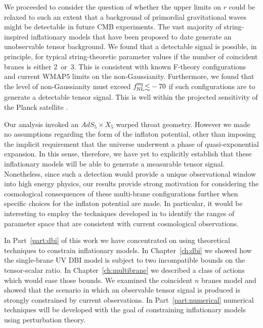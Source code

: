 We proceeded to consider the question of whether the upper limits on 
$r$ could be relaxed to such an extent 
that a background of primordial gravitational waves 
might be detectable in future CMB experiments. The vast majority of 
string-inspired inflationary models that have been proposed to date 
generate an unobservable tensor background. We 
found that a detectable signal is possible, in principle, 
for typical string-theoretic parameter values 
if the number of coincident branes is either $2$~or~$3$. 
This is consistent with known F-theory configurations and 
current WMAP5 limits on the non-Gaussianity. Furthermore, 
we found that the level of non-Gaussianity must exceed $\fnleq 
\lsim -70$ if such configurations are to generate a detectable tensor 
signal. This is well within the projected sensitivity 
of the Planck satellite \cite{planck}.   


Our analysis invoked an $AdS_5 \times X_5$ warped throat geometry. However we 
made no assumptions regarding the form of the inflaton potential, other 
than imposing the implicit requirement that the universe underwent a phase of 
quasi-exponential expansion. In this sense, therefore, we have 
yet to explicitly establish that these inflationary models will 
be able to generate a measurable tensor signal. 
Nonetheless, since such a detection would provide a unique observational 
window into high energy physics, our results 
provide strong motivation for considering the cosmological consequences 
of these multi-brane configurations further when specific choices for the 
inflaton potential are made. In particular, it would be interesting 
to employ the techniques developed in
\cite{bean,Peiris:2007gz,Lorenz:2007ze,Bean:2007eh,Bean:2008ga} 
to identify the ranges of parameter space that are consistent 
with current cosmological observations.  

In Part~\ref{part:dbi} of this work we have concentrated on using theoretical
techniques to constrain inflationary models. In Chapter~\ref{ch:dbi} we showed
how the single-brane UV DBI model is subject to two incompatible bounds on the
tensor-scalar ratio. In Chapter~\ref{ch:multibrane} we described a class of
actions
which would ease those bounds. We examined the coincident $n$ branes model and
showed that the scenario in which an observable tensor signal is produced is
strongly constrained by current observations. In Part~\ref{part:numerical}
numerical techniques will be developed with the goal of constraining
inflationary models using perturbation theory.

